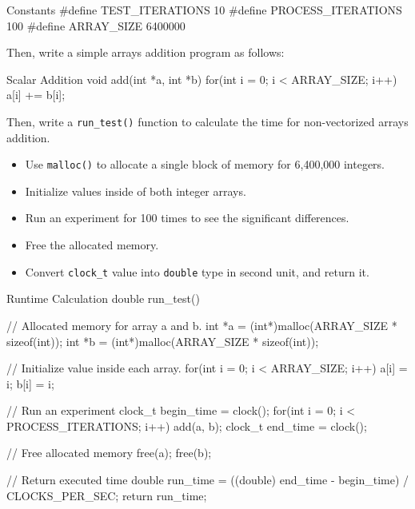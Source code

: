 \documentclass[12pt, a4paper]{article}
\begin{document}
            \begin{codeblock}[minted language=c]{Constants}
                #define TEST_ITERATIONS 10
                #define PROCESS_ITERATIONS 100
                #define ARRAY_SIZE 6400000
            \end{codeblock}

            Then, write a simple arrays addition program as follows:
            \begin{codeblock}[minted language=c]{Scalar Addition}
                void add(int *a, int *b) {
                    for(int i = 0; i < ARRAY_SIZE; i++) {
                        a[i] += b[i];
                    }
                }
            \end{codeblock}

    \pagebreak

            Then, write a \texttt{run\_test()} function to calculate the time for non-vectorized arrays addition.
            \begin{itemize}
                \item Use \texttt{malloc()} to allocate a single block of memory for 6,400,000 integers.
                \item Initialize values inside of both integer arrays.
                \item Run an experiment for 100 times to see the significant differences.
                \item Free the allocated memory.
                \item Convert \texttt{clock\_t} value into \texttt{double} type in second unit, and return it.
            \end{itemize}

            \begin{codeblock}[minted language=c]{Runtime Calculation}
                double run_test() {
                    // Allocated memory for array a and b.
                    int *a = (int*)malloc(ARRAY_SIZE * sizeof(int));
                    int *b = (int*)malloc(ARRAY_SIZE * sizeof(int));

                    // Initialize value inside each array.
                    for(int i = 0; i < ARRAY_SIZE; i++) {
                        a[i] = i;
                        b[i] = i;
                    }

                    // Run an experiment
                    clock_t begin_time = clock();
                    for(int i = 0; i < PROCESS_ITERATIONS; i++) {
                        add(a, b);
                    }
                    clock_t end_time = clock();

                    // Free allocated memory
                    free(a);
                    free(b);

                    // Return executed time
                    double run_time = ((double) end_time - begin_time) / CLOCKS_PER_SEC;
                    return run_time;
                }
            \end{codeblock}
\end{document}
